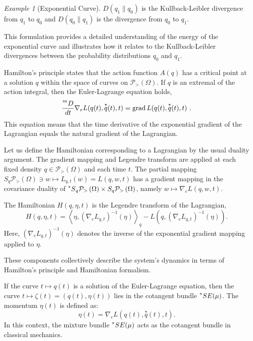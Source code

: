 \documentclass[axioms,article,submit,pdftex,moreauthors]{Definitions/mdpi}
\theoremstyle{plain}
\theoremstyle{remark}
\newtheorem{myexample}{Example}
\newcommand{\Grad}{\operatorname{grad}}
\newcommand{\expfibreat}[2]{S_{#1}\pdensitieson{#2}}
\newcommand{\mixfibreat}[2]{\prescript{*}{}{S}_{#1}\pdensitieson{#2}}
\newcommand{\pdensitieson}[1]{\mathcal P_{>}\left(#1\right)}
\newcommand{\eDerivby}[1]{\frac{\prescript{m}{}D}{d#1}}
\begin{document}
\begin{myexample}[Exponential Curve]
\( D(q_1 \parallel q_0) \) is the Kullback-Leibler divergence from \( q_1 \) to \( q_0 \) and \( D(q_0 \parallel q_1) \) is the divergence from \( q_0 \) to \( q_1 \).

This formulation provides a detailed understanding of the energy of the exponential curve and illustrates how it relates to the Kullback-Leibler divergences between the probability distributions \( q_0 \) and \( q_1 \).
\end{myexample} 

Hamilton's principle states that the action function \( A(q) \) has a critical point at a solution \( q \) within the space of curves on \( \pdensitieson \Omega \). If \( q \) is an extremal of the action integral, then the Euler-Lagrange equation holds, 
\begin{equation*} 
\eDerivby t \nabla_e L(q(t), \overset{\star}{q}(t), t) = \Grad L(q(t), \overset{\star}{q}(t), t) \ .
\end{equation*} 
This equation means that the time derivative of the exponential gradient of the Lagrangian equals the natural gradient of the Lagrangian.

Let us define the Hamiltonian corresponding to a Lagrangian by the usual duality argument. The gradient mapping and Legendre transform are applied at each fixed density \( q \in \pdensitieson \Omega\) and each time \( t \). The partial mapping \( \expfibreat{q}{\Omega} \ni w \mapsto L_{q,t} (w) = L(q, w, t) \) has a gradient mapping in the covariance duality of \( \mixfibreat q \Omega \times \expfibreat q \Omega \), namely \( w \mapsto \nabla_e L(q, w, t) \). 

The Hamiltonian \( H(q, \eta, t) \) is the Legendre transform of the Lagrangian, 
\begin{equation*} 
H(q, \eta, t) = \left\langle \eta, (\nabla_e L_{q,t})^{-1}(\eta) \right\rangle_q - L(q, (\nabla_e L_{q,t})^{-1}(\eta)).
\end{equation*} 
Here, \( (\nabla_e L_{q,t})^{-1}(\eta) \) denotes the inverse of the exponential gradient mapping applied to \( \eta \).

These components collectively describe the system's dynamics in terms of Hamilton's principle and Hamiltonian formalism.

If the curve \( t \mapsto q(t) \) is a solution of the Euler-Lagrange equation, then the curve \( t \mapsto \zeta(t) = (q(t), \eta(t)) \) lies in the cotangent bundle \( \prescript{*}{}S E (\mu) \). The momentum \( \eta(t) \) is defined as:
\begin{equation*} 
\eta(t) = \nabla_e L(q(t), \overset{\star}{q}(t), t).
\end{equation*} 
In this context, the mixture bundle \( \prescript{*}{}S E (\mu) \) acts as the cotangent bundle in classical mechanics.
\end{document}
